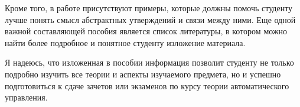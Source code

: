 \documentclass[../../TAU.tex]{subfiles}
\begin{document}
        Кроме того, в работе присутствуют примеры, которые должны помочь студенту лучше понять смысл абстрактных утверждений и связи между ними. Еще одной важной составляющей пособия является список литературы, в котором можно найти более подробное и понятное студенту изложение материала.

        Я надеюсь, что изложенная в пособии информация позволит студенту не только подробно изучить все теории и аспекты изучаемого предмета, но и успешно подготовиться к сдаче зачетов или экзаменов по курсу теории автоматического управления.
\end{document}
